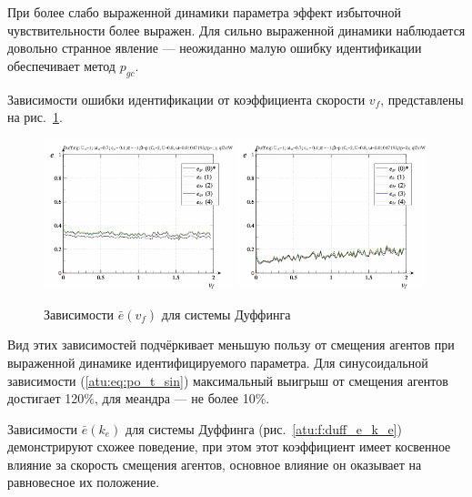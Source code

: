 При более слабо выраженной динамики параметра
эффект избыточной чувствительности более выражен.
Для сильно выраженной динамики наблюдается довольно
странное явление --- неожиданно малую ошибку идентификации
обеспечивает метод $p_{gc}$.

Зависимости ошибки идентификации от коэффициента скорости $v_f$,
представлены на рис.~\ref{atu:f:duff_e_v_f}.

\begin{figure}[ht!]
\begin{center}
  \includegraphics[width=0.49\textwidth]{p/cha/duff/duff_id-p_v_f_sign.png}
  \hfill
  \includegraphics[width=0.49\textwidth]{p/cha/duff/duff_id-p_v_f_sin.png}
\end{center}
  \caption{Зависимости $\bar{e}(v_f)$ для системы Дуффинга}
\label{atu:f:duff_e_v_f}
\end{figure}

Вид этих зависимостей подчёркивает меньшую пользу от смещения агентов
при выраженной динамике идентифицируемого параметра.
Для синусоидальной зависимости (\ref{atu:eq:po_t_sin})
максимальный выигрыш от смещения агентов
достигает 120\%, для меандра --- не более 10\%.

Зависимости $\bar{e}(k_e)$ для системы Дуффинга
(рис.~\ref{atu:f:duff_e_k_e})
демонстрируют схожее поведение, при этом
этот коэффициент имеет косвенное влияние за скорость смещения агентов,
основное влияние он оказывает на равновесное их положение.

